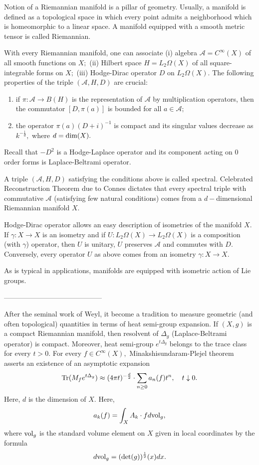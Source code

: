 \documentclass{article}
\begin{document}
Notion of a Riemannian manifold is a pillar of geometry. Usually, a manifold is defined as a topological space in which every point admits a neighborhood which is homeomorphic to a linear space. A manifold equipped with a smooth metric tensor is called Riemannian.

With every Riemannian manifold, one can associate (i) algebra $\mathcal{A}=C^{\infty}(X)$ of all smooth functions on $X;$ (ii) Hilbert space $H=L_2\Omega(X)$ of all square-integrable forms on $X;$ (iii) Hodge-Dirac operator $D$ on $L_2\Omega(X).$ The following properties of the triple $(\mathcal{A},H,D)$ are crucial:
\begin{enumerate}
\item if $\pi:\mathcal{A}\to B(H)$ is the representation of $\mathcal{A}$ by multiplication operators, then the commutator $[D,\pi(a)]$ is bounded for all $a\in\mathcal{A};$
\item the operator $\pi(a)(D+i)^{-1}$ is compact and its singular values decrease as $k^{-\frac1d},$ where $d={\rm dim}(X).$
\end{enumerate}
Recall that $-D^2$ is a Hodge-Laplace operator and its component acting on $0$ order forms is Laplace-Beltrami operator.

A triple $(\mathcal{A},H,D)$ satisfying the conditions above is called spectral. Celebrated Reconstruction Theorem due to Connes dictates that every spectral triple with commutative $\mathcal{A}$ (satisfying few natural conditions) comes from a $d-$dimensional Riemannian manifold $X.$

Hodge-Dirac operator allows an easy description of isometries of the manifold $X.$ If $\gamma:X\to X$ is an isometry and if $U:L_2\Omega(X)\to L_2\Omega(X)$ is a composition (with $\gamma$) operator, then $U$ is unitary, $U$ preserves $\mathcal{A}$ and commutes with $D.$ Conversely, every operator $U$ as above comes from an isometry $\gamma:X\to X.$


As is typical in applications, manifolds are equipped with isometric action of Lie groups. 


------------------------------------------

After the seminal work of Weyl, it become a tradition to measure geometric (and often topological) quantities in terms of heat semi-group expansion. If $(X,g)$ is a compact Riemannian manifold, then resolvent of $\Delta_g$ (Laplace-Beltrami operator) is compact. Moreover, heat semi-group $e^{t\Delta_g}$ belongs to the trace class for every $t>0.$ For every $f\in C^{\infty}(X),$ Minakshisundaram-Plejel theorem asserts an existence of an asymptotic expansion
\begin{equation}\label{heat asymptotic}
{\rm Tr}(M_fe^{t\Delta_g})\approx (4\pi t)^{-\frac{d}{2}}\cdot \sum_{n\geq0}a_n(f)t^n,\quad t\downarrow0.
\end{equation}
Here, $d$ is the dimension of $X.$ Here,
\begin{equation}\label{normality of coefficients}
a_k(f)=\int_X A_k\cdot f d{\rm vol}_g,
\end{equation}
where ${\rm vol}_g$ is the standard volume element on $X$ given in local coordinates by the formula
$$d{\rm vol}_g=({\rm det}(g))^{\frac12}(x)dx.$$
\end{document}
